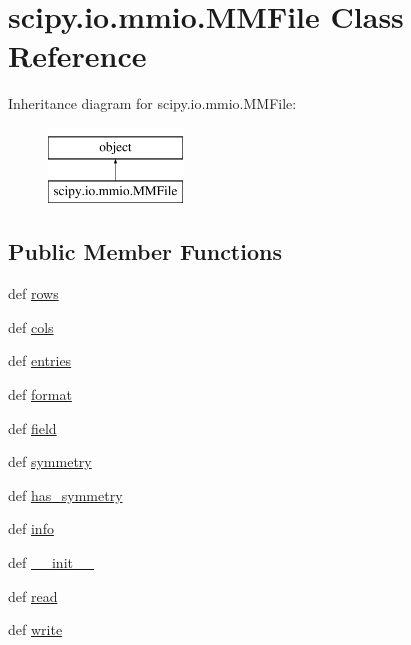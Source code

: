 \hypertarget{classscipy_1_1io_1_1mmio_1_1MMFile}{}\section{scipy.\+io.\+mmio.\+M\+M\+File Class Reference}
\label{classscipy_1_1io_1_1mmio_1_1MMFile}
Inheritance diagram for scipy.\+io.\+mmio.\+M\+M\+File\+:\begin{figure}[H]
\begin{center}
\leavevmode
\includegraphics[height=2.000000cm]{classscipy_1_1io_1_1mmio_1_1MMFile}
\end{center}
\end{figure}
\subsection*{Public Member Functions}
\begin{DoxyCompactItemize}
\item 
def \hyperlink{classscipy_1_1io_1_1mmio_1_1MMFile_ad2c71184b84d3f2820302f8d7facc23d}{rows}
\item 
def \hyperlink{classscipy_1_1io_1_1mmio_1_1MMFile_a521da7acae6ecb5d41cd8e8fc70a12c9}{cols}
\item 
def \hyperlink{classscipy_1_1io_1_1mmio_1_1MMFile_ac4563d8e16fb17104f71952fd557dca3}{entries}
\item 
def \hyperlink{classscipy_1_1io_1_1mmio_1_1MMFile_aa8e522f68aead373ad93e7d8baa88319}{format}
\item 
def \hyperlink{classscipy_1_1io_1_1mmio_1_1MMFile_a80794741df85c6d5762b30f7fdae491d}{field}
\item 
def \hyperlink{classscipy_1_1io_1_1mmio_1_1MMFile_a1ddeb2591dec502113e2e130b4755fed}{symmetry}
\item 
def \hyperlink{classscipy_1_1io_1_1mmio_1_1MMFile_ae1da70ced34d56ce7b422d25b820b1e9}{has\+\_\+symmetry}
\item 
def \hyperlink{classscipy_1_1io_1_1mmio_1_1MMFile_aaf670f706978782f47b95e05e8af2f61}{info}
\item 
def \hyperlink{classscipy_1_1io_1_1mmio_1_1MMFile_a5edff4b35a5203c7975e911707edc586}{\+\_\+\+\_\+init\+\_\+\+\_\+}
\item 
def \hyperlink{classscipy_1_1io_1_1mmio_1_1MMFile_a9bd8127bbb3cb6ebd65c68324d6defbc}{read}
\item 
def \hyperlink{classscipy_1_1io_1_1mmio_1_1MMFile_a016a9d704bd5be2a789cb66c890a0c4c}{write}
\end{DoxyCompactItemize}
